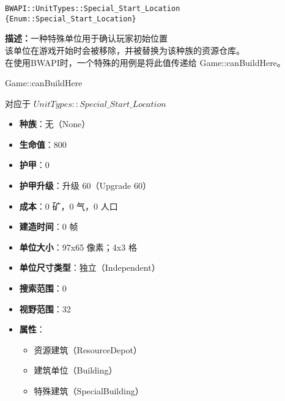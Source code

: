\begin{tcolorbox}[colback=white, colframe=black!60!white, title=Special\_Start\_Location(), arc=0mm]
    \begin{verbatim}
BWAPI::UnitTypes::Special_Start_Location {Enum::Special_Start_Location}
    \end{verbatim}
    \textbf{描述：}一种特殊单位用于确认玩家初始位置
  \\该单位在游戏开始时会被移除，并被替换为该种族的资源仓库。
  \\在使用BWAPI时，一个特殊的用例是将此值传递给 Game::canBuildHere。 
    \begin{refer}
        Game::canBuildHere
    \end{refer} 
    对应于  $UnitTypes::Special\_Start\_Location$ 
    \begin{itemize}
        \item \textbf{种族}：无（None）
        \item \textbf{生命值}：800
        \item \textbf{护甲}：0
        \item \textbf{护甲升级}：升级 60（Upgrade 60）
        \item \textbf{成本}：0 矿，0 气，0 人口
        \item \textbf{建造时间}：0 帧
        \item \textbf{单位大小}：97x65 像素；4x3 格
        \item \textbf{单位尺寸类型}：独立（Independent）
        \item \textbf{搜索范围}：0
        \item \textbf{视野范围}：32
        \item \textbf{属性}：
            \begin{itemize}
                \item 资源建筑（ResourceDepot）
                \item 建筑单位（Building）
                \item 特殊建筑（SpecialBuilding）
            \end{itemize}
    \end{itemize}
\end{tcolorbox}
